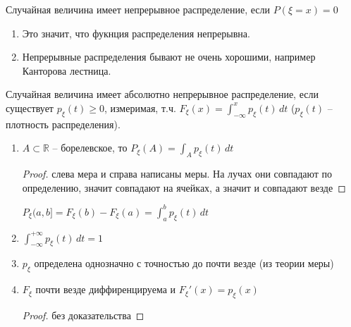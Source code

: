 \begin{definition}
    Случайная величина имеет непрерывное распределение, если 
    $P(\xi = x) = 0$

    \begin{remark}
        \begin{enumerate}
            \item {
                Это значит, что фукнция распределения непрерывна.
            }
            \item {
                Непрерывные распределения бывают не очень хорошими, например
                Канторова лестница.
            }
        \end{enumerate}
    \end{remark}
\end{definition}

\begin{definition}
    Случайная величина имеет абсолютно непрерывное распределение, если 
    существует $p_{\xi} (t) \geqslant 0$, измеримая, т.ч. $F_{\xi} (x) = 
    \int_{-\infty}^x p_{\xi} (t) \, dt$ ($p_{\xi}(t)$ -- плотность распределения).
\end{definition}

\begin{properties}
    \begin{enumerate}
        \item {
            $A \subset \mathbb{R}$ -- борелевское, то $P_{\xi} (A) = \int_{A} p_{\xi} (t) \, dt$

            \begin{proof}
                слева мера и справа написаны меры. На лучах они совпадают по определению, значит совпадают
                на ячейках, а значит и совпадают везде
            \end{proof} 

            $P_{\xi} (a, b] = F_{\xi} (b) - F_{\xi} (a) = \int_{a}^b p_{\xi} (t) \, dt$
        }
        \item {
            $\int_{-\infty}^{+\infty} p_{\xi} (t) \, dt = 1$
        }
        \item {
            $p_{\xi}$ определена однозначно с точностью до почти везде (из теории меры)
        }
        \item {
            $F_{\xi}$ почти везде диффиренцируема и $F_{\xi}' (x) = p_{\xi} (x)$

            \begin{proof}
                без доказательства
            \end{proof}
        }
    \end{enumerate}
\end{properties}

